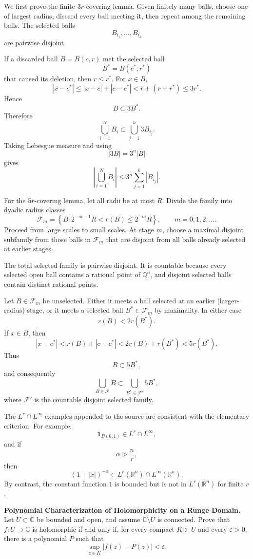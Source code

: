 \begin{solution}
We first prove the finite \(3r\)-covering lemma. Given finitely many balls, choose one of
largest radius, discard every ball meeting it, then repeat among the remaining balls. The
selected balls
\[
B_{i_1},\ldots,B_{i_k}
\]
are pairwise disjoint.

If a discarded ball \(B=B(c,r)\) met the selected ball
\[
B^*=B(c^*,r^*)
\]
that caused its deletion, then \(r\le r^*\). For \(x\in B\),
\[
|x-c^*|
\le
|x-c|+|c-c^*|
<
r+(r+r^*)
\le
3r^*.
\]
Hence
\[
B\subset3B^*.
\]
Therefore
\[
\boxed{
\bigcup_{i=1}^{N}B_i
\subset
\bigcup_{j=1}^{k}3B_{i_j}.
}
\]
Taking Lebesgue measure and using
\[
|3B|=3^n|B|
\]
gives
\[
\boxed{
\left|\bigcup_{i=1}^{N}B_i\right|
\le
3^n\sum_{j=1}^{k}|B_{i_j}|.
}
\]

For the \(5r\)-covering lemma, let all radii be at most \(R\). Divide the family into
dyadic radius classes
\[
\mathcal F_m
=
\left\{
B:
2^{-m-1}R<r(B)\le2^{-m}R
\right\},
\qquad m=0,1,2,\ldots.
\]
Proceed from large scales to small scales. At stage \(m\), choose a maximal disjoint
subfamily from those balls in \(\mathcal F_m\) that are disjoint from all balls already
selected at earlier stages.

The total selected family is pairwise disjoint. It is countable because every selected open
ball contains a rational point of \(\mathbb Q^n\), and disjoint selected balls contain
distinct rational points.

Let \(B\in\mathcal F_m\) be unselected. Either it meets a ball selected at an earlier
(larger-radius) stage, or it meets a selected ball \(B^*\in\mathcal F_m\) by maximality.
In either case
\[
r(B)<2r(B^*).
\]
If \(x\in B\), then
\[
|x-c^*|
<
r(B)+|c-c^*|
<
2r(B)+r(B^*)
<
5r(B^*).
\]
Thus
\[
B\subset5B^*,
\]
and consequently
\[
\boxed{
\bigcup_{B\in\mathcal F}B
\subset
\bigcup_{B^*\in\mathcal F'}5B^*,
}
\]
where \(\mathcal F'\) is the countable disjoint selected family.

The \(L^r\cap L^\infty\) examples appended to the source are consistent with the elementary
criterion. For example,
\[
\mathbf1_{B(0,1)}\in L^r\cap L^\infty,
\]
and if
\[
\alpha>\frac nr,
\]
then
\[
(1+|x|)^{-\alpha}\in L^r(\mathbb R^n)\cap L^\infty(\mathbb R^n).
\]
By contrast, the constant function \(1\) is bounded but is not in \(L^r(\mathbb R^n)\) for
finite \(r\).
\end{solution}


\begin{problem}[CP-II-0532]
\label{prob:cp-ii-0532}
\textbf{Polynomial Characterization of Holomorphicity on a Runge Domain.}
Let \(U\subset\mathbb C\) be bounded and open, and assume
\(\mathbb C\setminus U\) is connected. Prove that \(f:U\to\mathbb C\) is
holomorphic if and only if, for every compact \(K\Subset U\) and every
\(\varepsilon>0\), there is a polynomial \(P\) such that
\[
\sup_{z\in K}|f(z)-P(z)|<\varepsilon.
\]
\end{problem}


